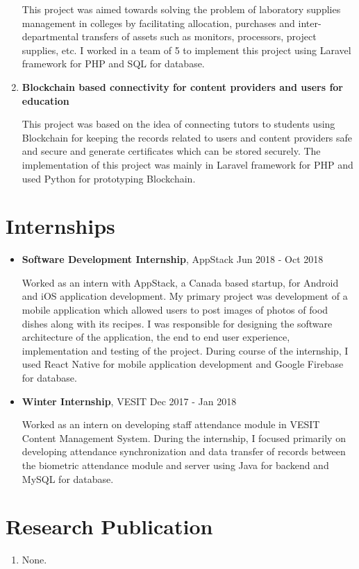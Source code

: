 \documentclass[margin]{res}
\begin{document}
\begin{resume}
\begin{enumerate}
  This project was aimed towards solving the problem of laboratory supplies management in colleges by facilitating allocation, purchases and inter-departmental transfers of assets such as monitors, processors, project supplies, etc. I worked in a team of 5 to implement this project using Laravel framework for PHP and SQL for database.
  \item {\bf Blockchain based connectivity for content providers and users for education}
  
  This project was based on the idea of connecting tutors to students using Blockchain for keeping the records related to users and content providers safe and secure and generate certificates which can be stored securely. The implementation of this project was mainly in Laravel framework for PHP and used Python for prototyping Blockchain. 
\end{enumerate}

  \section{Internships}
  \begin{itemize}
    \item {\bf Software Development Internship},  AppStack \hfill Jun 2018 - Oct 2018
    
    Worked as an intern with AppStack, a Canada based startup, for Android and iOS application development. My primary project was development of a mobile application which allowed users to post images of photos of food dishes along with its recipes. I was responsible for designing the software architecture of the application, the end to end user experience, implementation and testing of the project. During course of the internship, I used React Native for mobile application development and Google Firebase for database.
    \item {\bf Winter Internship}, VESIT \hfill Dec 2017 - Jan 2018
    
    Worked as an intern on developing staff attendance module in VESIT Content Management System. During the internship, I  focused primarily on developing attendance synchronization and data transfer of records between the biometric attendance module and server using Java for backend and MySQL for database.
 \end{itemize}
 
\section{Research Publication}
\begin{enumerate}
  \item None. 
\end{enumerate}


\end{resume}
\end{document}
